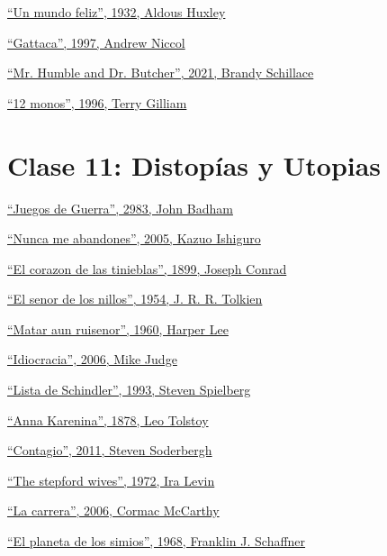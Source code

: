 \documentclass[12pt, twoside, openright]{report} %
\begin{document}
\underline{\enquote{Un mundo feliz}, 1932, Aldous Huxley}

\underline{\enquote{Gattaca}, 1997, Andrew Niccol}

\underline{\enquote{Mr. Humble and Dr. Butcher}, 2021, Brandy Schillace}

\underline{\enquote{12 monos}, 1996, Terry Gilliam}

\chapter{Clase 11: Distopías y Utopias}

\underline{\enquote{Juegos de Guerra}, 2983, John Badham}

\underline{\enquote{Nunca me abandones}, 2005, Kazuo Ishiguro}

\underline{\enquote{El corazon de las tinieblas}, 1899, Joseph Conrad}

\underline{\enquote{El senor de los nillos}, 1954, J. R. R. Tolkien}

\underline{\enquote{Matar aun ruisenor}, 1960,  Harper Lee}

\underline{\enquote{Idiocracia}, 2006, Mike Judge}

\underline{\enquote{Lista de Schindler}, 1993, Steven Spielberg}

\underline{\enquote{Anna Karenina}, 1878, Leo Tolstoy}

\underline{\enquote{Contagio}, 2011, Steven Soderbergh}

\underline{\enquote{The stepford wives}, 1972, Ira Levin}

\underline{\enquote{La carrera}, 2006, Cormac McCarthy}

\underline{\enquote{El planeta de los simios}, 1968, Franklin J. Schaffner}
\end{document}
